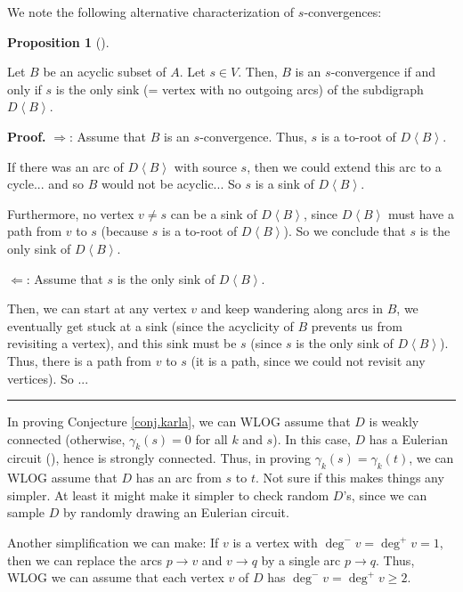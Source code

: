 \documentclass[numbers=enddot,12pt,final,onecolumn,notitlepage]{scrartcl}%
\theoremstyle{definition}
\newtheorem{prop}[theo]{Proposition}
\newenvironment{proposition}[1][]
{\begin{prop}[#1]\begin{leftbar}}
{\end{leftbar}\end{prop}}
\newenvironment{proof}[1][Proof]{\noindent\textbf{#1.} }{\ \rule{0.5em}{0.5em}}
\newenvironment{noncompile}{}{}
\theoremstyle{plainsl}
\begin{document}
We note the following alternative characterization of $s$-convergences:

\begin{proposition}
Let $B$ be an acyclic subset of $A$.
Let $s \in V$.
Then, $B$ is an $s$-convergence if and only if $s$ is the only sink (= vertex with
no outgoing arcs) of the subdigraph $D\left\langle B\right\rangle $.
\end{proposition}

\begin{proof}
$\Longrightarrow$: Assume that $B$ is an $s$-convergence. Thus, $s$ is a to-root of $D\left\langle B\right\rangle $.

If there was an arc of $D\left\langle B\right\rangle $ with source $s$, then we could extend this arc to a cycle... and so $B$ would not be acyclic... So $s$ is a sink of $D\left\langle B\right\rangle $.

Furthermore, no vertex $v \neq s$ can be a sink of $D\left\langle B\right\rangle $, since $D\left\langle B\right\rangle $ must have a path from $v$ to $s$ (because $s$ is a to-root of $D\left\langle B\right\rangle $). So we conclude that $s$ is the only sink of $D\left\langle B\right\rangle $.
\medskip

$\Longleftarrow$: Assume that $s$ is the only sink of $D\left\langle B\right\rangle $.

Then, we can start at any vertex $v$ and keep wandering along arcs in $B$, we eventually get stuck at a sink (since the acyclicity of $B$ prevents us from revisiting a vertex), and this sink must be $s$ (since $s$ is the only sink of $D\left\langle B\right\rangle $). Thus, there is a path from $v$ to $s$ (it is a path, since we could not revisit any vertices). So ...
\end{proof}

\begin{noncompile}
In proving Conjecture \ref{conj.karla}, we can WLOG assume that $D$ is weakly
connected (otherwise, $\gamma_{k}\left(  s\right)  =0$ for all $k$ and $s$).
In this case, $D$ has a Eulerian circuit (\cite[Theorem 4.7.2]{22s}), hence is
strongly connected. Thus, in proving $\gamma_{k}\left(  s\right)  =\gamma
_{k}\left(  t\right)  $, we can WLOG assume that $D$ has an arc from $s$ to
$t$. Not sure if this makes things any simpler. At least it might make it
simpler to check random $D$'s, since we can sample $D$ by randomly drawing an
Eulerian circuit.

Another simplification we can make: If $v$ is a vertex with $\deg^{-}%
v=\deg^{+}v=1$, then we can replace the arcs $p\rightarrow v$ and
$v\rightarrow q$ by a single arc $p\rightarrow q$. Thus, WLOG we can assume
that each vertex $v$ of $D$ has $\deg^{-}v=\deg^{+}v\geq2$.
\end{noncompile}
\end{document}
